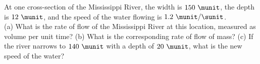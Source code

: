 At one cross-section of the Mississippi River, the width is $150\
\munit$, the depth is $12\ \munit$, and the speed of the water
flowing is $1.2\ \munit/\sunit$.\\
%
(a) What is the rate of flow of the Mississippi River at this
location, measured as volume per unit time?\answercheck\hwendpart
%
(b) What is the corresponding rate of flow of mass?\answercheck\hwendpart
%
(c) If the river narrows to $140\ \munit$ with a depth of $20\
\munit$, what is the new speed of the water?\answercheck
